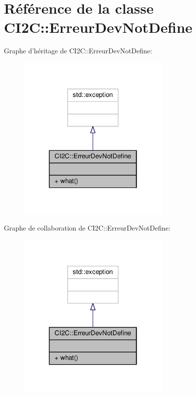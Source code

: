 \hypertarget{classCI2C_1_1ErreurDevNotDefine}{\section{Référence de la classe C\+I2\+C\+:\+:Erreur\+Dev\+Not\+Define}
\label{classCI2C_1_1ErreurDevNotDefine}
}


Graphe d'héritage de C\+I2\+C\+:\+:Erreur\+Dev\+Not\+Define\+:
\nopagebreak
\begin{figure}[H]
\begin{center}
\leavevmode
\includegraphics[width=214pt]{classCI2C_1_1ErreurDevNotDefine__inherit__graph}
\end{center}
\end{figure}


Graphe de collaboration de C\+I2\+C\+:\+:Erreur\+Dev\+Not\+Define\+:
\nopagebreak
\begin{figure}[H]
\begin{center}
\leavevmode
\includegraphics[width=214pt]{classCI2C_1_1ErreurDevNotDefine__coll__graph}
\end{center}
\end{figure}

